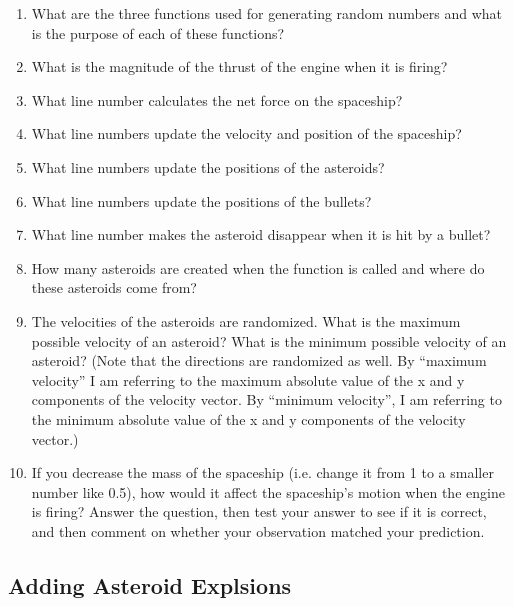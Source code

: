 \begin{enumerate}
\begin{enumerate}
	\item What are the three functions used for generating random numbers and what is the purpose of each of these functions?
\vspace{0.5in}
	\item What is the magnitude of the thrust of the engine when it is firing?
\vspace{0.5in}
	\item What line number calculates the net force on the spaceship?
\vspace{0.5in}
	\item What line numbers update the velocity and position of the spaceship?
\vspace{0.5in}
	\item What line numbers update the positions of the asteroids?
\vspace{0.5in}
	\item What line numbers update the positions of the bullets?
\vspace{0.5in}
	\item What line number makes the asteroid disappear when it is hit by a bullet?
\vspace{0.5in}
	\item How many asteroids are created when the function  is called and where do these asteroids come from?
\vspace{0.5in}
	\item The velocities of the asteroids are randomized. What is the maximum possible velocity of an asteroid? What is the minimum possible velocity of an asteroid?  (Note that the directions are randomized as well. By ``maximum velocity'' I am referring to the maximum absolute value of the x and y components of the velocity vector. By ``minimum velocity'', I am referring to the minimum absolute value of the x and y components of the velocity vector.)
\vspace{0.5in}
	\item If you decrease the mass of the spaceship (i.e. change it from 1 to a smaller number like 0.5), how would it affect the spaceship's motion when the engine is firing? Answer the question, then test your answer to see if it is correct, and then comment on whether your observation matched your prediction.
	
	\smallframe{\ }
	
\end{enumerate}

\subsection*{Adding Asteroid Explsions}


\end{enumerate}
